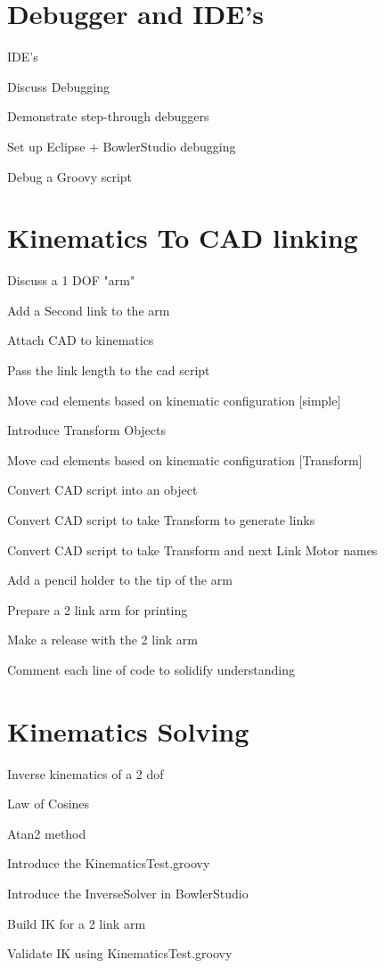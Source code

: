 \documentclass{article}
\begin{document}
\section{Debugger and IDE's}
\begin{todolist}
	\item IDE's
	\item Discuss Debugging
	\item Demonstrate step-through debuggers
	\item Set up Eclipse + BowlerStudio debugging
	\item Debug a Groovy script
\end{todolist}

\section{Kinematics To CAD linking}
\begin{todolist}
	\item Discuss a 1 DOF "arm"
	\item Add a Second link to the arm
	\item Attach CAD to kinematics
	\item Pass the link length to the cad script
	\item Move cad elements based on kinematic configuration [simple]
	\item Introduce Transform Objects
	\item Move cad elements based on kinematic configuration [Transform]
	\item Convert CAD script into an object
	\item Convert CAD script to take Transform to generate links
	\item Convert CAD script to take Transform and next Link Motor names
	\item Add a pencil holder to the tip of the  arm
	\item Prepare a 2 link arm for printing
	\item Make a release with the 2 link arm
	\item Comment each line of code to solidify understanding
\end{todolist}

\section{Kinematics Solving}
\begin{todolist}
	\item Inverse kinematics of a 2 dof 
	\item Law of Cosines
	\item Atan2 method 
	\item Introduce the KinematicsTest.groovy
	\item Introduce the InverseSolver in BowlerStudio
	\item Build IK for a 2 link arm 
	\item Validate IK using KinematicsTest.groovy
\end{todolist}
\end{document}
